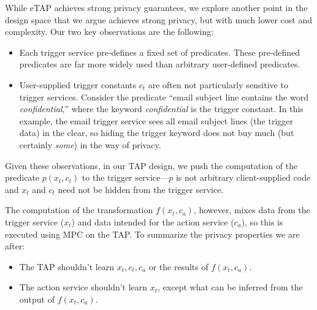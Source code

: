 While \textsf{eTAP} achieves strong privacy guarantees, we explore another point
in the design space that we argue achieves strong privacy, but with much lower
cost and complexity. Our two key observations are the following:
\begin{itemize}
  \item Each trigger service pre-defines a fixed set of predicates. These
    pre-defined predicates are far more widely used than arbitrary user-defined
    predicates.
  \item User-supplied trigger constants $c_t$ are often not particularly
    sensitive to trigger services. Consider the predicate ``email subject line
    contains the word \emph{confidential},'' where the keyword
    \emph{confidential} is the trigger constant. In this example, the email
    trigger service sees all email subject lines (the trigger data) in the
    clear, so hiding the trigger keyword does not buy much (but certainly
    \emph{some}) in the way of privacy.
\end{itemize}
Given these observations, in our TAP design, we push the computation of the
predicate $p(x_t, c_t)$ to the trigger service---$p$ is not arbitrary
client-supplied code and $x_t$ and $c_t$ need not be hidden from the trigger
service. 

The computation of the transformation $f(x_t, c_a)$, however, mixes data from
the trigger service ($x_t$) and data intended for the action service ($c_a$), so
this is executed using MPC on the TAP. To summarize the privacy properties we
are after:
\begin{itemize}
  \item The TAP shouldn't learn $x_t, c_t, c_a$ or the results of $f(x_t, c_a)$.
  \item The action service shouldn't learn $x_t$, except what can be inferred
    from the output of $f(x_t, c_a)$.
\end{itemize}

